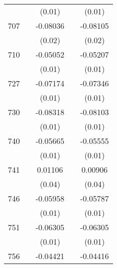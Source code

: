 \begin{table}[htbp]
\begin{tabular}{l*{4}{c}}
                    &                     &      (0.01)         &                     &      (0.01)         \\
707                 &                     &    -0.08036\sym{***}&                     &    -0.08105\sym{***}\\
                    &                     &      (0.02)         &                     &      (0.02)         \\
710                 &                     &    -0.05052\sym{***}&                     &    -0.05207\sym{***}\\
                    &                     &      (0.01)         &                     &      (0.01)         \\
727                 &                     &    -0.07174\sym{***}&                     &    -0.07346\sym{***}\\
                    &                     &      (0.01)         &                     &      (0.01)         \\
730                 &                     &    -0.08318\sym{***}&                     &    -0.08103\sym{***}\\
                    &                     &      (0.01)         &                     &      (0.01)         \\
740                 &                     &    -0.05665\sym{***}&                     &    -0.05555\sym{***}\\
                    &                     &      (0.01)         &                     &      (0.01)         \\
741                 &                     &     0.01106         &                     &     0.00906         \\
                    &                     &      (0.04)         &                     &      (0.04)         \\
746                 &                     &    -0.05958\sym{***}&                     &    -0.05787\sym{***}\\
                    &                     &      (0.01)         &                     &      (0.01)         \\
751                 &                     &    -0.06305\sym{***}&                     &    -0.06305\sym{***}\\
                    &                     &      (0.01)         &                     &      (0.01)         \\
756                 &                     &    -0.04421\sym{***}&                     &    -0.04416\sym{***}\\

\end{tabular}
\end{table}
